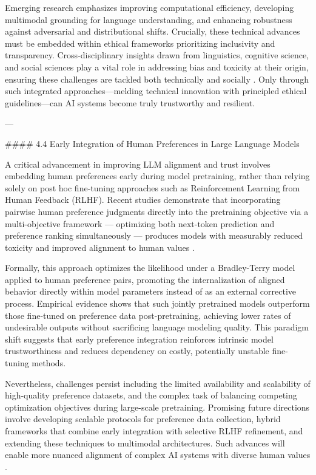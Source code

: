 \documentclass[11pt]{article}
\begin{document}
Emerging research emphasizes improving computational efficiency, developing multimodal grounding for language understanding, and enhancing robustness against adversarial and distributional shifts. Crucially, these technical advances must be embedded within ethical frameworks prioritizing inclusivity and transparency. Cross-disciplinary insights drawn from linguistics, cognitive science, and social sciences play a vital role in addressing bias and toxicity at their origin, ensuring these challenges are tackled both technically and socially \cite{ref34,ref35}. Only through such integrated approaches—melding technical innovation with principled ethical guidelines—can AI systems become truly trustworthy and resilient.

---

#### 4.4 Early Integration of Human Preferences in Large Language Models

A critical advancement in improving LLM alignment and trust involves embedding human preferences early during model pretraining, rather than relying solely on post hoc fine-tuning approaches such as Reinforcement Learning from Human Feedback (RLHF). Recent studies demonstrate that incorporating pairwise human preference judgments directly into the pretraining objective via a multi-objective framework — optimizing both next-token prediction and preference ranking simultaneously — produces models with measurably reduced toxicity and improved alignment to human values \cite{ref41}.

Formally, this approach optimizes the likelihood under a Bradley-Terry model applied to human preference pairs, promoting the internalization of aligned behavior directly within model parameters instead of as an external corrective process. Empirical evidence shows that such jointly pretrained models outperform those fine-tuned on preference data post-pretraining, achieving lower rates of undesirable outputs without sacrificing language modeling quality. This paradigm shift suggests that early preference integration reinforces intrinsic model trustworthiness and reduces dependency on costly, potentially unstable fine-tuning methods.

Nevertheless, challenges persist including the limited availability and scalability of high-quality preference datasets, and the complex task of balancing competing optimization objectives during large-scale pretraining. Promising future directions involve developing scalable protocols for preference data collection, hybrid frameworks that combine early integration with selective RLHF refinement, and extending these techniques to multimodal architectures. Such advances will enable more nuanced alignment of complex AI systems with diverse human values \cite{ref41}.
\end{document}
